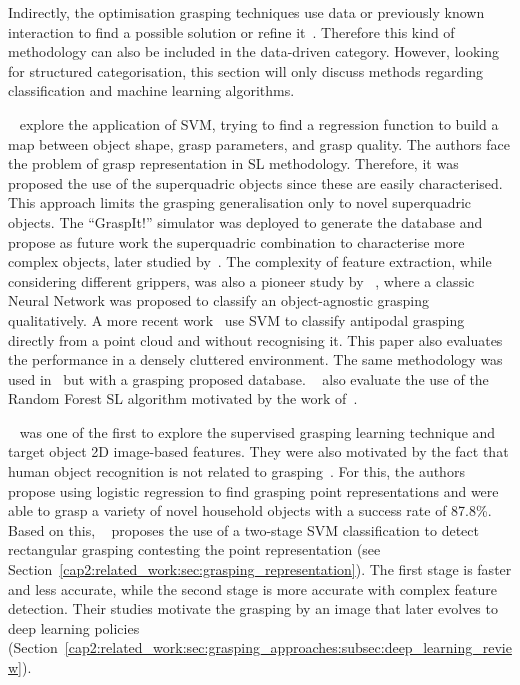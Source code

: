 Indirectly, the optimisation grasping techniques use data or previously known interaction to find a possible solution or refine it~\cite{roa2009finding}. Therefore this kind of methodology can also be included in the data-driven category. However, looking for structured categorisation, this section will only discuss methods regarding classification and machine learning algorithms.

\citeauthor{Pelossof2004}~\cite{Pelossof2004} explore the application of \ac{SVM}, trying to find a regression function to build a map between object shape, grasp parameters, and grasp quality. The authors face the problem of grasp representation in \ac{SL} methodology. Therefore, it was proposed the use of the superquadric objects since these are easily characterised. This approach limits the grasping generalisation only to novel superquadric objects. The ``GraspIt!'' simulator was deployed to generate the database and propose as future work the superquadric combination to characterise more complex objects, later studied by~\cite{Goldfeder2007}. The complexity of feature extraction, while considering different grippers, was also a pioneer study by \citeauthor{dini2000planning}~\cite{dini2000planning}, where a classic Neural Network was proposed to classify an object-agnostic grasping qualitatively. A more recent work~\cite{tenPas} use \ac{SVM} to classify antipodal grasping directly from a point cloud and without recognising it. This paper also evaluates the performance in a densely cluttered environment. The same methodology was used in~\cite{Mahler2017b} but with a grasping proposed database. \citeauthor{Mahler2017b}~\cite{Mahler2017b} also evaluate the use of the Random Forest \ac{SL} algorithm motivated by the work of~\cite{seita2016large}. %

\citeauthor{Saxena2008}~\cite{Saxena2008} was one of the first to explore the supervised grasping learning technique and target object 2D image-based features. They were also motivated by the fact that human object recognition is not related to grasping~\cite{goodale1991neurological}. For this, the authors propose using logistic regression to find grasping point representations and were able to grasp a variety of novel household objects with a success rate of 87.8\%. Based on this, \citeauthor{Jiang2011a}~\cite{Jiang2011a} proposes the use of a two-stage \ac{SVM} classification to detect rectangular grasping contesting the point representation (see Section~\ref{cap2:related_work:sec:grasping_representation}). The first stage is faster and less accurate, while the second stage is more accurate with complex feature detection. Their studies motivate the grasping by an image that later evolves to deep learning policies (Section~\ref{cap2:related_work:sec:grasping_approaches:subsec:deep_learning_review}).

